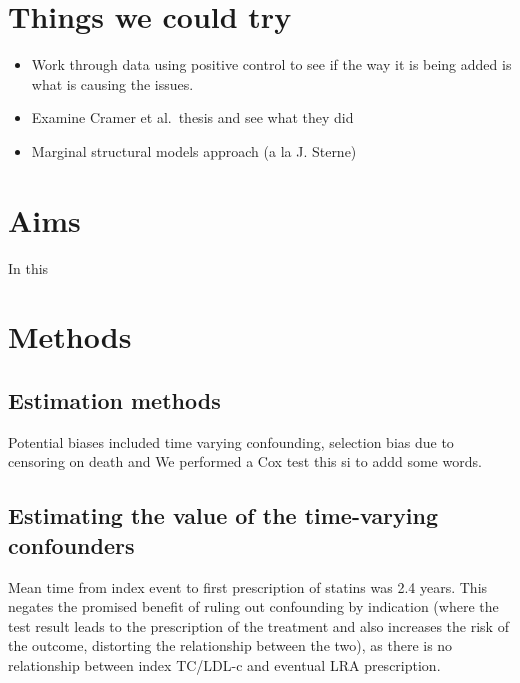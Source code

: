 \documentclass[a4paper, twoside]{templates/ociamthesis}
\providecommand{\tightlist}{%
  \setlength{\itemsep}{0pt}\setlength{\parskip}{0pt}}
\begin{document}
\hypertarget{things-we-could-try}{%
\section{Things we could try}\label{things-we-could-try}}

\begin{itemize}
\tightlist
\item
  Work through data using positive control to see if the way it is being added is what is causing the issues.
\item
  Examine Cramer et al.~thesis and see what they did
\item
  Marginal structural models approach (a la J. Sterne)
\end{itemize}

\hypertarget{aims-1}{%
\section{Aims}\label{aims-1}}

In this

\hypertarget{methods-1}{%
\section{Methods}\label{methods-1}}

\hypertarget{estimation-methods}{%
\subsection{Estimation methods}\label{estimation-methods}}

Potential biases included time varying confounding, selection bias due to censoring on death and
We performed a Cox test this si to addd some words.

\hypertarget{estimating-the-value-of-the-time-varying-confounders}{%
\subsection{Estimating the value of the time-varying confounders}\label{estimating-the-value-of-the-time-varying-confounders}}

Mean time from index event to first prescription of statins was 2.4 years. This negates the promised benefit of ruling out confounding by indication (where the test result leads to the prescription of the treatment and also increases the risk of the outcome, distorting the relationship between the two), as there is no relationship between index TC/LDL-c and eventual LRA prescription.
\end{document}
